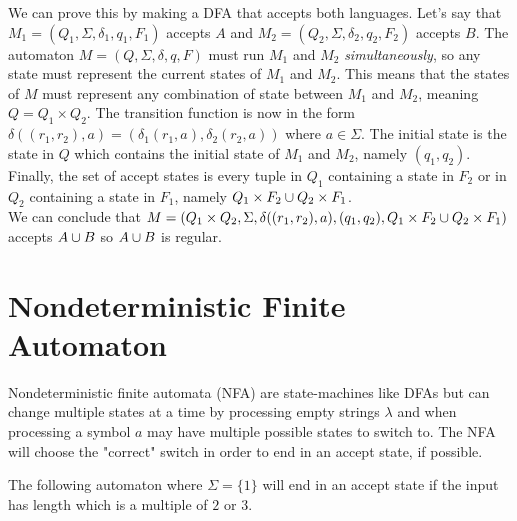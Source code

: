 \documentclass{article}
\newcommand{\emptyString}{\lambda}
\begin{document}
We can prove this by making a DFA that accepts both languages.
Let's say that \(M_1=(Q_1, \Sigma, \delta_1, q_1, F_1)\) accepts \(A\)
and \(M_2=(Q_2, \Sigma, \delta_2, q_2, F_2)\) accepts \(B\).
The automaton \(M=(Q, \Sigma, \delta, q, F)\) must run \(M_1\) and \(M_2\) \textit{simultaneously},
so any state must represent the current states of \(M_1\) and \(M_2\).
This means that the states of \(M\) must represent any combination of state between
\(M_1\) and \(M_2\), meaning \(Q=Q_1 \times Q_2\).
The transition function is now in the form
\(\delta((r_1, r_2), a) = (\delta_1(r_1, a), \delta_2(r_2, a))\) where \(a\in\Sigma\).
The initial state is the state in \(Q\) which contains the initial state of \(M_1\)
and \(M_2\), namely \((q_1, q_2)\). Finally, the set of accept states
is every tuple in \(Q_1\) containing a state in \(F_2\) or in \(Q_2\) containing a state in \(F_1\), namely
\(Q_1 \times F_2 \cup Q_2 \times F_1\). \\
We can conclude that \(M=(Q_1 \times Q_2, \Sigma, \delta((r_1, r_2), a), (q_1, q_2), Q_1 \times F_2 \cup Q_2 \times F_1)\)
accepts \(A \cup B\) so \(A \cup B\) is regular.

\pagebreak

\section{Nondeterministic Finite Automaton}

Nondeterministic finite automata (NFA) are state-machines
like DFAs but can change multiple states at a time by processing
empty strings \(\emptyString\) and when processing a symbol
\(a\) may have multiple possible states to switch to.
The NFA will choose the "correct" switch in order to end in an accept state, if possible.

The following automaton where \(\Sigma = \{1\}\) will end in an accept state
if the input has length which is a multiple of \(2\) or \(3\).

\newcommand\double[3][10]{%
  \draw (#2)
    edge [bend left=#1,draw=none]
    coordinate[at start](#2-#3-s)
    coordinate[at end](#2-#3-e)
    (#3)
    edge [bend right=#1,draw=none]
    coordinate[at start](#3-#2-e)
    coordinate[at end](#3-#2-s)
    (#3);
}
\end{document}
